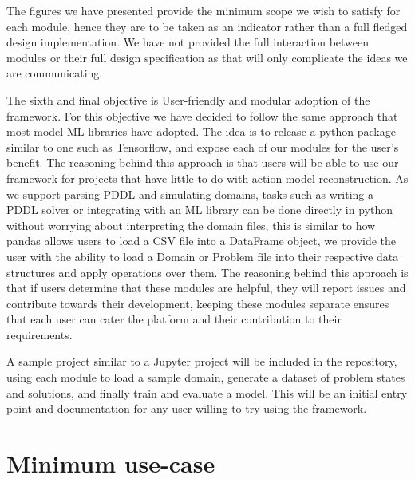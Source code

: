 The figures we have presented provide the minimum scope we wish to satisfy for each module, hence they are to be taken as an indicator rather than a full fledged design implementation. We have not provided the full interaction between modules or their full design specification as that will only complicate the ideas we are communicating.

The sixth and final objective is User-friendly and modular adoption of the framework.
For this objective we have decided to follow the same approach that most model ML libraries have adopted.
The idea is to release a python package similar to one such as Tensorflow, and expose each of our modules for the user's benefit.
The reasoning behind this approach is that users will be able to use our framework for projects that have little to do with action model reconstruction.
As we support parsing PDDL and simulating domains, tasks such as writing a PDDL solver or integrating with an ML library can be done directly in python without worrying about interpreting the domain files, this is similar to how pandas allows users to load a CSV file into a DataFrame object, we provide the user with the ability to load a Domain or Problem file into their respective data structures and apply operations over them.
The reasoning behind this approach is that if users determine that these modules are helpful, they will report issues and contribute towards their development, keeping these modules separate ensures that each user can cater the platform and their contribution to their requirements.

A sample project similar to a Jupyter project will be included in the repository, using each module to load a sample domain, generate a dataset of problem states and solutions, and finally train and evaluate a model.
This will be an initial entry point and documentation for any user willing to try using the framework.


\newpage
% 


\section{Minimum use-case}


